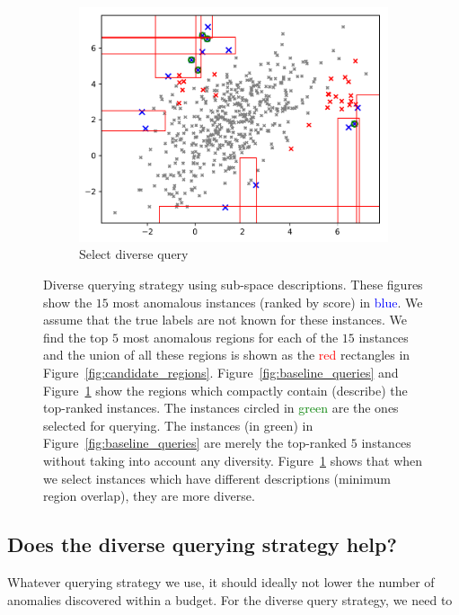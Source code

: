 \documentclass{article} %
\begin{document}
\begin{figure}
	\begin{subfigure}[b]{0.48\textwidth}
		\includegraphics[width=\textwidth]{query_compact_ntop5_100_trees_aad}
		\caption{Select diverse query}
		\label{fig:diverse_queries}
	\end{subfigure}
	\caption{Diverse querying strategy using sub-space descriptions. These figures show the $15$ most anomalous instances (ranked by score) in \textcolor{blue}{blue}. We assume that the true labels are not known for these instances. We find the top $5$ most anomalous regions for each of the $15$ instances and the union of all these regions is shown as the \textcolor{red}{red} rectangles in Figure~\ref{fig:candidate_regions}. Figure~\ref{fig:baseline_queries} and Figure~\ref{fig:diverse_queries} show the regions which compactly contain (describe) the top-ranked instances. The instances circled in \textcolor{green}{green} are the ones selected for querying. The instances (in green) in Figure~\ref{fig:baseline_queries} are merely the top-ranked $5$ instances without taking into account any diversity. Figure~\ref{fig:diverse_queries} shows that when we select instances which have different descriptions (minimum region overlap), they are more diverse.} \label{fig:diverse}
\end{figure}

\subsection{Does the diverse querying strategy help?}
Whatever querying strategy we use, it should ideally not lower the number of anomalies discovered within a budget. For the diverse query strategy, we need to 
\end{document}
